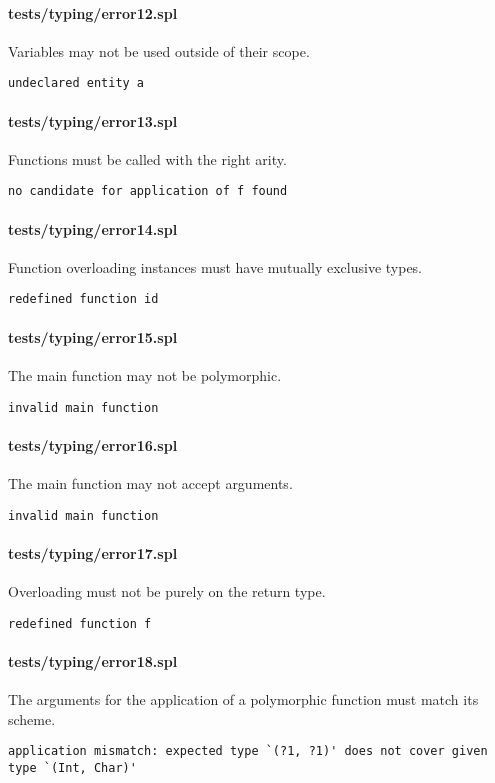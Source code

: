 \documentclass[a4paper]{article}
\begin{document}
\paragraph{tests/typing/error12.spl}
Variables may not be used outside of their scope.
    \begin{verbatim}
undeclared entity a\end{verbatim}

\paragraph{tests/typing/error13.spl}
Functions must be called with the right arity.
    \begin{verbatim}
no candidate for application of f found\end{verbatim}

\paragraph{tests/typing/error14.spl}
Function overloading instances must have mutually exclusive types.
    \begin{verbatim}
redefined function id\end{verbatim}

\paragraph{tests/typing/error15.spl}
The main function may not be polymorphic.
    \begin{verbatim}
invalid main function\end{verbatim}

\paragraph{tests/typing/error16.spl}
The main function may not accept arguments.
    \begin{verbatim}
invalid main function\end{verbatim}

\paragraph{tests/typing/error17.spl}
Overloading must not be purely on the return type.
    \begin{verbatim}
redefined function f\end{verbatim}

\paragraph{tests/typing/error18.spl}
The arguments for the application of a polymorphic function must match its scheme.
    \begin{verbatim}
application mismatch: expected type `(?1, ?1)' does not cover given type `(Int, Char)'\end{verbatim}
\end{document}
